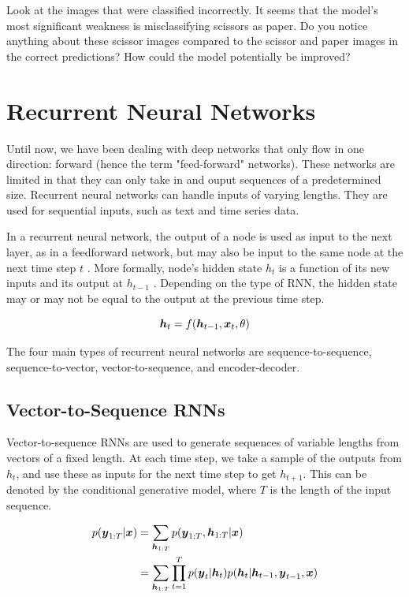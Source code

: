 \documentclass{article}
\begin{document}
\FloatBarrier

Look at the images that were classified incorrectly. It seems that the model's most significant weakness is misclassifying scissors as paper. Do you notice anything about these scissor images compared to the scissor and paper images in the correct predictions? How could the model potentially be improved?

\section{Recurrent Neural Networks}

Until now, we have been dealing with deep networks that only flow in one direction: forward (hence the term "feed-forward" networks). These networks are limited in that they can only take in and ouput sequences of a predetermined size. Recurrent neural networks can handle inputs of varying lengths. They are used for sequential inputs, such as text and time series data.

In a recurrent neural network, the output of a node is used as input to the next layer, as in a feedforward network, but may also be input to the same node at the next time step \(t\) \cite{hands-on-ml}. More formally, node's hidden state \(h_t\) is a function of its new inputs and its output at \(h_{t-1}\) \cite{Goodfellow-et-al-2016}. Depending on the type of RNN, the hidden state may or may not be equal to the output at the previous time step.

\[\vb*{h}_t = f(\vb*{h}_{t-1},\vb*{x}_t,\theta)\]

The four main types of recurrent neural networks are sequence-to-sequence, sequence-to-vector, vector-to-sequence, and encoder-decoder.

\subsection{Vector-to-Sequence RNNs}

Vector-to-sequence RNNs are used to generate sequences of variable lengths from vectors of a fixed length. At each time step, we take a sample of the outputs from \(h_t\), and use these as inputs for the next time step to get \(h_{t+1}\). This can be denoted by the conditional generative model, where \(T\) is the length of the input sequence.

\begin{align*}
    p(\vb*{y}_{1:T}|\vb*{x}) &= \sum_{\vb*{h}_{1:T}}p(\vb*{y}_{1:T},\vb*{h}_{1:T}|\vb*{x}) \\
    &= \sum_{\vb*{h}_{1:T}} \prod_{t=1}^T p(\vb*{y}_t|\vb*{h}_t)p(\vb*{h}_t|\vb*{h}_{t-1},\vb*{y}_{t-1},\vb*{x})
\end{align*}
\end{document}
